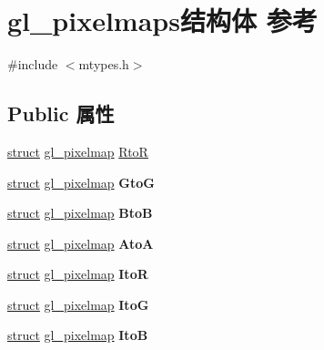 \hypertarget{structgl__pixelmaps}{}\section{gl\+\_\+pixelmaps结构体 参考}
\label{structgl__pixelmaps}


{\ttfamily \#include $<$mtypes.\+h$>$}

\subsection*{Public 属性}
\begin{DoxyCompactItemize}
\item 
\hyperlink{interfacestruct}{struct} \hyperlink{structgl__pixelmap}{gl\+\_\+pixelmap} \hyperlink{structgl__pixelmaps_ab4f675948ee15565b74fd10f3e8c18d4}{RtoR}
\item 
\mbox{\label{structgl__pixelmaps_afbf0a59f30cdcd8e3fc0125d0dc4f6a7}} 
\hyperlink{interfacestruct}{struct} \hyperlink{structgl__pixelmap}{gl\+\_\+pixelmap} {\bfseries GtoG}
\item 
\mbox{\label{structgl__pixelmaps_a227f315673dd5dbc03fb21fd9e684f42}} 
\hyperlink{interfacestruct}{struct} \hyperlink{structgl__pixelmap}{gl\+\_\+pixelmap} {\bfseries BtoB}
\item 
\mbox{\label{structgl__pixelmaps_ab1f791e80b67cdfd776174c01dee3eed}} 
\hyperlink{interfacestruct}{struct} \hyperlink{structgl__pixelmap}{gl\+\_\+pixelmap} {\bfseries AtoA}
\item 
\mbox{\label{structgl__pixelmaps_a9c8703a8b37cefbac94bdbc903d3daf4}} 
\hyperlink{interfacestruct}{struct} \hyperlink{structgl__pixelmap}{gl\+\_\+pixelmap} {\bfseries ItoR}
\item 
\mbox{\label{structgl__pixelmaps_af43ac9a018dc6ff5c87c0dc2123f59d5}} 
\hyperlink{interfacestruct}{struct} \hyperlink{structgl__pixelmap}{gl\+\_\+pixelmap} {\bfseries ItoG}
\item 
\mbox{\label{structgl__pixelmaps_a4fd38d5bc9bf4f21330410fdb6c2ea88}} 
\hyperlink{interfacestruct}{struct} \hyperlink{structgl__pixelmap}{gl\+\_\+pixelmap} {\bfseries ItoB}

\end{DoxyCompactItemize}
